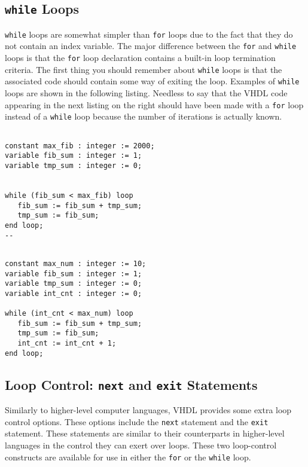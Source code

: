 \subsection{\texttt{while} Loops}
\texttt{while} loops are somewhat simpler than \texttt{for} loops due to the fact that they do not contain an index variable. The major difference between the \texttt{for} and \texttt{while} loops is that the \texttt{for} loop declaration contains a built-in loop termination criteria. The first thing you should remember about \texttt{while} loops is that the associated code should contain some way of exiting the loop. Examples of \texttt{while} loops are shown in the following listing. Needless to say that the VHDL code appearing in the next listing on the right should have been made with a \texttt{for} loop instead of a \texttt{while} loop because the number of iterations is actually known.

\vspace{10pt}
\noindent
\begin{minipage}{0.5\linewidth}
\begin{lstlisting}

constant max_fib : integer := 2000;
variable fib_sum : integer := 1;
variable tmp_sum : integer := 0;


while (fib_sum < max_fib) loop
   fib_sum := fib_sum + tmp_sum;
   tmp_sum := fib_sum;
end loop;
--
\end{lstlisting}
\end{minipage}
\begin{minipage}{0.49\linewidth}
\begin{lstlisting}

constant max_num : integer := 10;
variable fib_sum : integer := 1;
variable tmp_sum : integer := 0;
variable int_cnt : integer := 0;

while (int_cnt < max_num) loop
   fib_sum := fib_sum + tmp_sum;
   tmp_sum := fib_sum;
   int_cnt := int_cnt + 1;
end loop;
\end{lstlisting}
\end{minipage}

\subsection{Loop Control: \texttt{next} and \texttt{exit} Statements}

Similarly to higher-level computer languages, VHDL provides some extra loop control options. These options include the \texttt{next} statement and the \texttt{exit} statement. These statements are similar to their counterparts in higher-level languages in the control they can exert over loops. These two loop-control constructs are available for use in either the \texttt{for} or the \texttt{while} loop.

